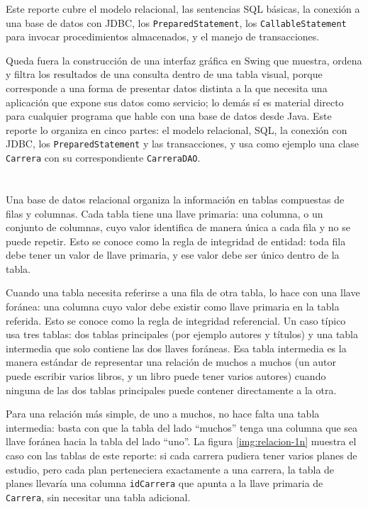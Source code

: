 \documentclass[10pt,a4paper]{article}
\begin{document}
Este reporte cubre el modelo relacional, las sentencias SQL básicas, la conexión a una base de datos con JDBC, los \texttt{PreparedStatement}, los \texttt{CallableStatement} para invocar procedimientos almacenados, y el manejo de transacciones.

Queda fuera la construcción de una interfaz gráfica en Swing que muestra, ordena y filtra los resultados de una consulta dentro de una tabla visual, porque corresponde a una forma de presentar datos distinta a la que necesita una aplicación que expone sus datos como servicio; lo demás sí es material directo para cualquier programa que hable con una base de datos desde Java. Este reporte lo organiza en cinco partes: el modelo relacional, SQL, la conexión con JDBC, los \texttt{PreparedStatement} y las transacciones, y usa como ejemplo una clase \texttt{Carrera} con su correspondiente \texttt{CarreraDAO}.

\section{\color{colorIPN}{El modelo relacional}}

Una base de datos relacional organiza la información en tablas compuestas de filas y columnas. Cada tabla tiene una llave primaria: una columna, o un conjunto de columnas, cuyo valor identifica de manera única a cada fila y no se puede repetir. Esto se conoce como la regla de integridad de entidad: toda fila debe tener un valor de llave primaria, y ese valor debe ser único dentro de la tabla.

Cuando una tabla necesita referirse a una fila de otra tabla, lo hace con una llave foránea: una columna cuyo valor debe existir como llave primaria en la tabla referida. Esto se conoce como la regla de integridad referencial. Un caso típico usa tres tablas: dos tablas principales (por ejemplo autores y títulos) y una tabla intermedia que solo contiene las dos llaves foráneas. Esa tabla intermedia es la manera estándar de representar una relación de muchos a muchos (un autor puede escribir varios libros, y un libro puede tener varios autores) cuando ninguna de las dos tablas principales puede contener directamente a la otra.

Para una relación más simple, de uno a muchos, no hace falta una tabla intermedia: basta con que la tabla del lado \enquote{muchos} tenga una columna que sea llave foránea hacia la tabla del lado \enquote{uno}. La figura \ref{img:relacion-1n} muestra el caso con las tablas de este reporte: si cada carrera pudiera tener varios planes de estudio, pero cada plan perteneciera exactamente a una carrera, la tabla de planes llevaría una columna \texttt{idCarrera} que apunta a la llave primaria de \texttt{Carrera}, sin necesitar una tabla adicional.
\end{document}
